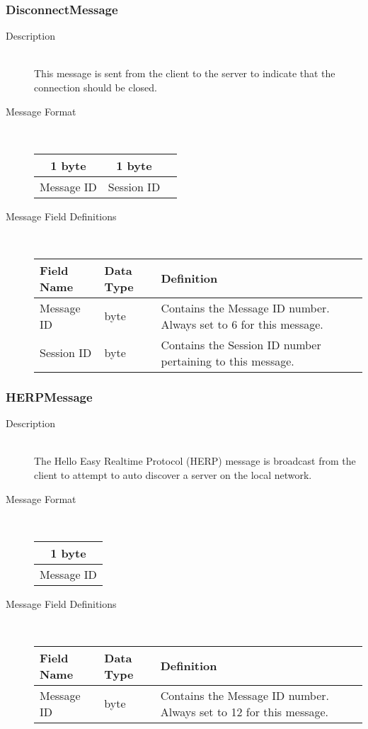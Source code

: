 \documentclass[12pt,letterpaper,titlepage]{article}
\begin{document}
\subsubsection{DisconnectMessage}
	\begin{description}
	\item[Description] \hfill \\
		This message is sent from the client to the server to indicate that the connection should be closed.
	\item[Message Format] \hfill \\
	\begin{tabular}{ | c | c | c | }
		\hline
		1 byte & 1 byte \\
		\hline
		Message ID & Session ID \\
		\hline
	\end{tabular}
	\item[Message Field Definitions] \hfill \\
	\begin{tabular}{ | p{3cm} | p{1.5cm} | p{8cm} | }
		\hline
		Field Name & Data Type & Definition \\
		\hline
		Message ID & byte & Contains the Message ID number. 
					\newline Always set to 6 for this message. \\
		\hline
		Session ID & byte & Contains the Session ID number pertaining to this message. \\
		\hline
	\end{tabular}
	\end{description}
	
	\subsubsection{HERPMessage}
	\begin{description}
	\item[Description] \hfill \\
		The Hello Easy Realtime Protocol (HERP) message is broadcast from the client to attempt to auto discover a server on the local network.
	\item[Message Format] \hfill \\
	\begin{tabular}{ | c | }
		\hline
		1 byte \\
		\hline
		Message ID \\
		\hline
	\end{tabular}
	\item[Message Field Definitions] \hfill \\
	\begin{tabular}{ | p{3cm} | p{1.5cm} | p{8cm} | }
		\hline
		Field Name & Data Type & Definition \\
		\hline
		Message ID & byte & Contains the Message ID number. 
					\newline Always set to 12 for this message. \\
		\hline
	\end{tabular}
	\end{description}
	
\end{document}
